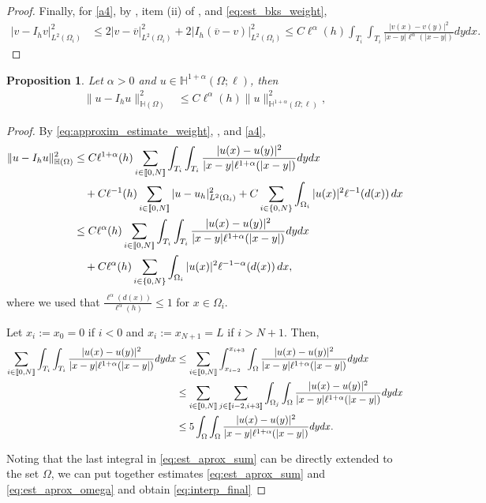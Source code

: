 \documentclass[10 pt]{article}
\newcommand\inter[1]{\llbracket #1\rrbracket}
\newtheorem{proposition}[theorem]{Proposition}
\numberwithin{equation}{section}
\newcommand{\weH}[1]{\mathbb H^{#1}(\Omega;\ell)}
\begin{document}
\begin{proof}
Finally, for \eqref{a4}, by , item (ii) of , and \eqref{eq:est_bks_weight}, 
\begin{align*}
    |v-I_h v|_{L^2(\Omega_i)}^2&\leq 2|v-\overline{v}|_{L^2(\Omega_i)}^2+2|I_h(\overline{v}-v)|_{L^2(\Omega_i)}^2\leq C\ell^{\alpha}(h)\int_{T_{i}}\int_{T_{i}}\frac{|v(x)-v(y)|^2}{|x-y|\ell^{\alpha}(|x-y|)}dy dx.
\end{align*}
\end{proof}


\begin{proposition}
Let $\alpha>0$ and $u\in\weH{1+\alpha}$, then
\begin{align}\label{eq:interp_final}
    \|u-I_hu\|^2_{\mathbb H(\Omega)}&\leq C\ell^{\alpha}(h) \|u\|^2_{\weH{1+\alpha}},
\end{align}
\end{proposition}
\begin{proof}
  By \eqref{eq:approxim_estimate_weight}, , and \eqref{a4},
%
\begin{align}
    \|u-I_h u\|^2_{\mathbb H(\Omega)}&\leq C \ell^{1+\alpha}(h)\sum_{i\in\inter{0,N}}\int_{T_i}\int_{T_i}\frac{|u(x)-u(y)|^2}{|x-y|\ell^{1+\alpha}(|x-y|)}dy dx\notag\\
    &\quad +C\ell^{-1}(h)\sum_{i\in\inter{0,N}}|u-u_h|_{L^2(\Omega_i)}^2+C\sum_{i\in\{0,N\}}\int_{\Omega_i}|u(x)|^2\ell^{-1}(d(x))\,dx\notag\\
    &\leq C \ell^{\alpha}(h)\sum_{i\in\inter{0,N}}\int_{T_i}\int_{T_i}\frac{|u(x)-u(y)|^2}{|x-y|\ell^{1+\alpha}(|x-y|)}dy dx\notag\\ 
    &\quad +C\ell^{\alpha}(h)\sum_{i\in\{0,N\}}\int_{\Omega_i}|u(x)|^2\ell^{-1-\alpha}(d(x))\,dx,\label{eq:est_aprox_sum}
\end{align}
where we used that $\frac{\ell^{\alpha}(d(x))}{\ell^{\alpha}(h)}\leq 1$ for $x\in\Omega_i$.  

Let $x_i:=x_0=0$ if $i<0$ and $x_i:=x_{N+1}=L$ if $i>N+1$.  Then, 
%
\begin{align}\notag
   \sum_{i\in\inter{0,N}} \int_{T_i}\int_{T_i}\frac{|u(x)-u(y)|^2}{|x-y|\ell^{1+\alpha}(|x-y|)}dy dx 
   &\leq \sum_{i\in\inter{0,N}} \int_{x_{i-2}}^{x_{i+3}}\int_{\Omega}\frac{|u(x)-u(y)|^2}{|x-y|\ell^{1+\alpha}(|x-y|)}dy dx\notag\\
   &\leq \sum_{i\in\inter{0,N}} \sum_{j\in \inter{i-2,i+3}}\int_{\Omega_j}\int_{\Omega}\frac{|u(x)-u(y)|^2}{|x-y|\ell^{1+\alpha}(|x-y|)}dy dx\notag\\
 & \leq 5\int_{\Omega}\int_{\Omega} \frac{|u(x)-u(y)|^2}{|x-y|\ell^{1+\alpha}(|x-y|)}dy dx. \label{eq:est_aprox_omega}
\end{align}

Noting that the last integral in \eqref{eq:est_aprox_sum} can be directly extended to the set $\Omega$, we can put together estimates \eqref{eq:est_aprox_sum} and \eqref{eq:est_aprox_omega} and obtain \eqref{eq:interp_final}
\end{proof}
%
\end{document}
